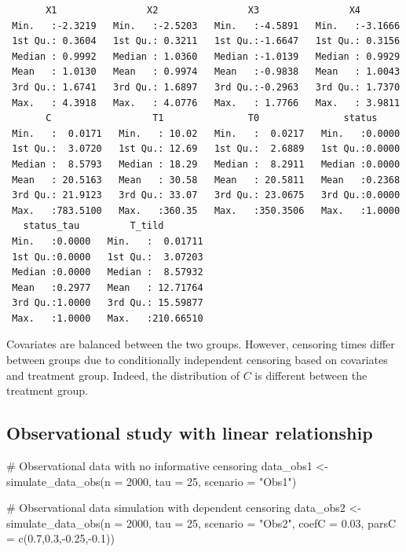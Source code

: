 \documentclass[
  11pt,
  a4paper,
]{article}
\newenvironment{Shaded}{}{}
\newcommand{\AttributeTok}[1]{\textcolor[rgb]{0.84,0.23,0.29}{#1}}
\newcommand{\CommentTok}[1]{\textcolor[rgb]{0.42,0.45,0.49}{#1}}
\newcommand{\DecValTok}[1]{\textcolor[rgb]{0.00,0.36,0.77}{#1}}
\newcommand{\FloatTok}[1]{\textcolor[rgb]{0.00,0.36,0.77}{#1}}
\newcommand{\FunctionTok}[1]{\textcolor[rgb]{0.44,0.26,0.76}{#1}}
\newcommand{\NormalTok}[1]{\textcolor[rgb]{0.14,0.16,0.18}{#1}}
\newcommand{\OtherTok}[1]{\textcolor[rgb]{0.44,0.26,0.76}{#1}}
\newcommand{\SpecialCharTok}[1]{\textcolor[rgb]{0.00,0.36,0.77}{#1}}
\newcommand{\StringTok}[1]{\textcolor[rgb]{0.01,0.18,0.38}{#1}}
\theoremstyle{plain}
\theoremstyle{plain}
\theoremstyle{plain}
\theoremstyle{definition}
\theoremstyle{remark}
\begin{document}
\begin{verbatim}
       X1                X2                X3                X4         
 Min.   :-2.3219   Min.   :-2.5203   Min.   :-4.5891   Min.   :-3.1666  
 1st Qu.: 0.3604   1st Qu.: 0.3211   1st Qu.:-1.6647   1st Qu.: 0.3156  
 Median : 0.9992   Median : 1.0360   Median :-1.0139   Median : 0.9929  
 Mean   : 1.0130   Mean   : 0.9974   Mean   :-0.9838   Mean   : 1.0043  
 3rd Qu.: 1.6741   3rd Qu.: 1.6897   3rd Qu.:-0.2963   3rd Qu.: 1.7370  
 Max.   : 4.3918   Max.   : 4.0776   Max.   : 1.7766   Max.   : 3.9811  
       C                  T1               T0               status      
 Min.   :  0.0171   Min.   : 10.02   Min.   :  0.0217   Min.   :0.0000  
 1st Qu.:  3.0720   1st Qu.: 12.69   1st Qu.:  2.6889   1st Qu.:0.0000  
 Median :  8.5793   Median : 18.29   Median :  8.2911   Median :0.0000  
 Mean   : 20.5163   Mean   : 30.58   Mean   : 20.5811   Mean   :0.2368  
 3rd Qu.: 21.9123   3rd Qu.: 33.07   3rd Qu.: 23.0675   3rd Qu.:0.0000  
 Max.   :783.5100   Max.   :360.35   Max.   :350.3506   Max.   :1.0000  
   status_tau         T_tild         
 Min.   :0.0000   Min.   :  0.01711  
 1st Qu.:0.0000   1st Qu.:  3.07203  
 Median :0.0000   Median :  8.57932  
 Mean   :0.2977   Mean   : 12.71764  
 3rd Qu.:1.0000   3rd Qu.: 15.59877  
 Max.   :1.0000   Max.   :210.66510  
\end{verbatim}

Covariates are balanced between the two groups. However, censoring times
differ between groups due to conditionally independent censoring based
on covariates and treatment group. Indeed, the distribution of \(C\) is
different between the treatment group.

\subsection{Observational study with linear
relationship}\label{sec-stat_obs}

\begin{Shaded}
\begin{Highlighting}[]
\CommentTok{\# Observational data with no informative censoring}
\NormalTok{data\_obs1 }\OtherTok{\textless{}{-}} \FunctionTok{simulate\_data\_obs}\NormalTok{(}\AttributeTok{n =} \DecValTok{2000}\NormalTok{, }\AttributeTok{tau =} \DecValTok{25}\NormalTok{, }\AttributeTok{scenario =} \StringTok{"Obs1"}\NormalTok{)}

\CommentTok{\# Observational data simulation with dependent censoring}
\NormalTok{data\_obs2 }\OtherTok{\textless{}{-}} \FunctionTok{simulate\_data\_obs}\NormalTok{(}\AttributeTok{n =} \DecValTok{2000}\NormalTok{, }\AttributeTok{tau =} \DecValTok{25}\NormalTok{, }\AttributeTok{scenario =} \StringTok{"Obs2"}\NormalTok{, }
                               \AttributeTok{coefC =} \FloatTok{0.03}\NormalTok{, }\AttributeTok{parsC =} \FunctionTok{c}\NormalTok{(}\FloatTok{0.7}\NormalTok{,}\FloatTok{0.3}\NormalTok{,}\SpecialCharTok{{-}}\FloatTok{0.25}\NormalTok{,}\SpecialCharTok{{-}}\FloatTok{0.1}\NormalTok{))}
\end{Highlighting}
\end{Shaded}
\end{document}
